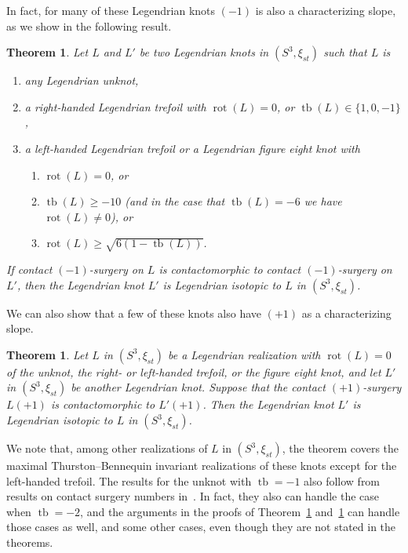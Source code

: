 \documentclass[11pt]{amsart} %
\DeclareMathOperator{\tb}{tb}
\DeclareMathOperator{\rot}{rot}
\theoremstyle{plain}
\newtheorem{thm}[Theorem]{Theorem}
\theoremstyle{definition}
\begin{document}
In fact, for many of these Legendrian knots $(-1)$ is also a characterizing slope, as we show in the following result.
\begin{thm}\label{minus1char}
Let $L$ and $L'$  be two Legendrian knots in $(S^3,\xi_{st})$ such that $L$ is
\begin{enumerate}
\item any Legendrian unknot,
\item a right-handed Legendrian trefoil with $\rot(L)=0$, or $\tb(L)\in \{1, 0,-1\}$,
\item a left-handed Legendrian trefoil or a Legendrian figure eight knot with 
\begin{enumerate}
	\item $\rot(L)=0$, or 
	\item  $\tb(L)\geq -10$ (and in the case that $\tb(L)=-6$ we have $\rot(L)\neq0$), or 
\item $\rot(L)\geq \sqrt{6(1-\tb(L))}$.
\end{enumerate}
\end{enumerate}
If contact $(-1)$-surgery on $L$ is contactomorphic to contact $(-1)$-surgery on $L'$, then the Legendrian knot $L'$ is Legendrian isotopic to $L$ in $(S^3,\xi_{st})$. 
\end{thm}
We can also show that a few of these knots also have $(+1)$ as a characterizing slope.
\begin{thm}\label{1characterize}
Let $L$ in $(S^3,\xi_{st})$ be a Legendrian realization with $\rot(L)=0$ of the unknot, the right- or left-handed trefoil, or the figure eight knot, and let $L'$ in $(S^3,\xi_{st})$ be another Legendrian knot. Suppose that the contact $(+1)$-surgery $L(+1)$ is contactomorphic to $L'(+1)$. Then the Legendrian knot $L'$ is Legendrian isotopic to $L$ in $(S^3,\xi_{st})$. 
\end{thm}
We note that, among other realizations of $L$ in $(S^3,\xi_{st})$, the theorem covers the maximal Thurston--Bennequin invariant realizations of these knots except for the left-handed trefoil. The results for the unknot with $\tb=-1$ also follow from results on contact surgery numbers in~\cite{EtnyreKegelOnaranPre}. In fact, they also can handle the case when $\tb=-2$, and the arguments in the proofs of Theorem~\ref{minus1char} and~\ref{1characterize} can handle those cases as well, and some other cases, even though they are not stated in the theorems. 
\end{document}
